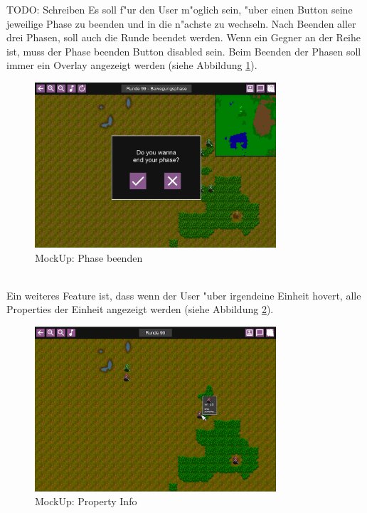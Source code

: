 \documentclass[12pt, titlepage]{scrartcl}
\newcounter{subsubsubsection}[subsubsection]
\begin{document}
			        TODO: Schreiben
			        Es soll f"ur den User m"oglich sein, "uber einen Button seine jeweilige Phase zu beenden und in die n"achste zu wechseln. Nach Beenden aller drei Phasen, soll auch die Runde beendet werden. Wenn ein Gegner an der Reihe ist, muss der Phase beenden Button disabled sein. Beim Beenden der Phasen soll immer ein Overlay angezeigt werden (siehe Abbildung \ref{Phase_End}). \\
			        \begin{figure}[H] 
    				    \centering
    				    \includegraphics[width=0.8\textwidth]{images/mockUps/EndPhase.png}
    				    \caption{MockUp: Phase beenden}
    				    \label{Phase_End}
			        \end{figure}
			        \ \\ Ein weiteres Feature ist, dass wenn der User "uber irgendeine Einheit hovert, alle Properties der Einheit angezeigt werden (siehe Abbildung \ref{Property_Info}). \\
			        \begin{figure}[H] 
    				    \centering
    				    \includegraphics[width=0.8\textwidth]{images/mockUps/showPropertiesWhenHovered.png}
    				    \caption{MockUp: Property Info}
    				    \label{Property_Info}
			        \end{figure}
\end{document}
